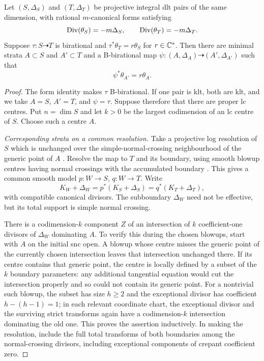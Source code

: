 \begin{lemma}\label{res:across}
 Let $(S,\Delta_S)$ and $(T,\Delta_T)$ be projective integral dlt pairs
 of the same dimension, with rational $m$-canonical forms satisfying
 \[
 \operatorname{Div}(\theta_S)=-m\Delta_S,\qquad
 \operatorname{Div}(\theta_T)=-m\Delta_T.
 \]
 Suppose $\tau:S\dashrightarrow T$ is birational and
 $\tau^*\theta_T=r\theta_S$ for $r\in\mathbb C^*$.
 Then there are minimal strata $A\subset S$ and $A'\subset T$ and a
 B-birational map $\psi:(A,\Delta_A)\dashrightarrow(A',\Delta_{A'})$
 such that
 \begin{equation}\label{res:across-identity}
  \psi^*\theta_{A'}=r\theta_A.
 \end{equation}
\end{lemma}

\begin{proof}
 The form identity makes $\tau$ B-birational.  If one pair is klt,
 both are klt, and we take $A=S$, $A'=T$, and $\psi=\tau$.
 Suppose therefore that there are proper lc centres.  Put $n=\dim S$
 and let $k>0$ be the largest codimension of an lc centre of $S$.
 Choose such a centre $A$.

 \emph{Corresponding strata on a common resolution.}
 Take a projective log resolution of $S$ which is unchanged over the
 simple-normal-crossing neighbourhood of the generic point of $A$
 \citep[Resolution Lemma, p.~633]{Szabo1994}.
 Resolve the map to $T$ and its boundary, using smooth blowup centres
 having normal crossings with the accumulated boundary
 \citep[Definition~25 and Theorem~35]{KollarSeattle2007}.  This gives a common smooth model
 $p:W\to S$, $q:W\to T$.  Write
 \[
 K_W+\Delta_W=p^*(K_S+\Delta_S)=q^*(K_T+\Delta_T),
 \]
 with compatible canonical divisors.  The subboundary $\Delta_W$
 need not be effective, but its total support is simple normal
 crossing.

 There is a codimension-$k$ component $Z$ of an intersection of $k$
 coefficient-one divisors of $\Delta_W$ dominating $A$.  To verify
 this during the chosen blowups, start with $A$ on the initial snc
 open.  A blowup whose centre misses the generic point of the
 currently chosen intersection leaves that intersection unchanged
 there.  If its centre contains that generic point, the centre is
 locally defined by a subset of the $k$ boundary parameters:
 any additional tangential equation would cut the intersection
 properly and so could not contain its generic point.  For
 a nontrivial such blowup, the subset has size $h\ge2$ and the
 exceptional divisor has coefficient
 $h-(h-1)=1$; in each relevant coordinate chart, the exceptional
 divisor and the surviving strict transforms again have a
 codimension-$k$ intersection dominating the old one.  This proves
 the assertion inductively.  In making the resolution, include the
 full total transforms of both boundaries among the normal-crossing
 divisors, including exceptional components of crepant coefficient
 zero.


\end{proof}
